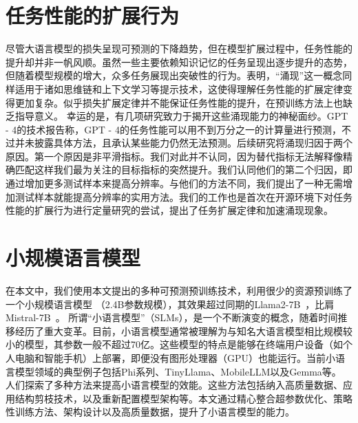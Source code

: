 \section{任务性能的扩展行为}

尽管大语言模型的损失呈现可预测的下降趋势，但在模型扩展过程中，任务性能的提升却并非一帆风顺。虽然一些主要依赖知识记忆的任务呈现出逐步提升的态势，但随着模型规模的增大，众多任务展现出突破性的行为\citep{srivastava2022beyond,wei2022emergent}。\citet{wei2022emergent}表明，“涌现”这一概念同样适用于诸如思维链\citep{wei2022chain}和上下文学习\citep{brown2020language}等提示技术，这使得理解任务性能的扩展定律变得更加复杂。似乎损失扩展定律并不能保证任务性能的提升，在预训练方法上也缺乏指导意义。
幸运的是，有几项研究致力于揭开这些涌现能力的神秘面纱。GPT - 4的技术报告\citep{openai2023gpt4}称，GPT - 4的任务性能可以用不到万分之一的计算量进行预测，不过并未披露具体方法，且承认某些能力仍然无法预测。后续研究\citep{schaeffer2023emergent}将涌现归因于两个原因。第一个原因是非平滑指标。我们对此并不认同，因为替代指标无法解释像精确匹配这样我们最为关注的目标指标的突然提升。我们认同他们的第二个归因，即通过增加更多测试样本来提高分辨率。与他们的方法不同，我们提出了一种无需增加测试样本就能提高分辨率的实用方法。我们的工作也是首次在开源环境下对任务性能的扩展行为进行定量研究的尝试，提出了任务扩展定律和加速涌现现象。 

 

\section{小规模语言模型}

在本文中，我们使用本文提出的多种可预测预训练技术，利用很少的资源预训练了一个小规模语言模型 （2.4B参数规模），其效果超过同期的Llama2-7B~\cite{touvron2023llama2}，比肩Mistral-7B~\cite{jiang2023mistral}。
所谓“小语言模型”（SLMs），是一个不断演变的概念，随着时间推移经历了重大变革。目前，小语言模型通常被理解为与知名大语言模型相比规模较小的模型，其参数一般不超过70亿。这些模型的特点是能够在终端用户设备（如个人电脑和智能手机）上部署，即便没有图形处理器（GPU）也能运行。当前小语言模型领域的典型例子包括Phi系列\citep{gunasekar2023textbooks, li2023textbooks, Javaheripi2023Phi2}、TinyLlama\citep{zhang2024tinyllama}、MobileLLM\citep{liu2024mobilellm}以及Gemma\citep{Banks2024Gemma}等。 人们探索了多种方法来提高小语言模型的效能。这些方法包括纳入高质量数据\citep{gunasekar2023textbooks, li2023textbooks, Javaheripi2023Phi2}、应用结构剪枝技术\citep{xia2023sheared}，以及重新配置模型架构\citep{liu2024mobilellm}等。本文通过精心整合超参数优化、策略性训练方法、架构设计以及高质量数据，提升了小语言模型的能力。



